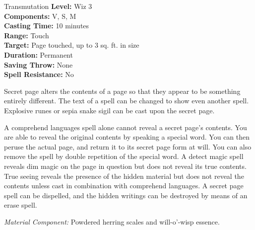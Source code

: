 {Transmutation}
{
	\textbf{Level:}
	Wiz 3\\
	\textbf{Components:}
	V, S, M\\
	\textbf{Casting Time:}
	10 minutes\\
	\textbf{Range:}
	Touch\\
	\textbf{Target:}
	Page touched, up to 3 sq. ft. in size\\
	\textbf{Duration:}
	Permanent\\
	\textbf{Saving Throw:}
	None\\
	\textbf{Spell Resistance:}
	No\\
}
{
	Secret page alters the contents of a page so that they appear to be something entirely different. The text of a spell can be changed to show even another spell. Explosive runes or sepia snake sigil can be cast upon the secret page.

	A comprehend languages spell alone cannot reveal a secret page's contents. You are able to reveal the original contents by speaking a special word. You can then peruse the actual page, and return it to its secret page form at will. You can also remove the spell by double repetition of the special word. A detect magic spell reveals dim magic on the page in question but does not reveal its true contents. True seeing reveals the presence of the hidden material but does not reveal the contents unless cast in combination with comprehend languages. A secret page spell can be dispelled, and the hidden writings can be destroyed by means of an erase spell.

	\textit{Material Component:}
	Powdered herring scales and will-o'-wisp essence.

}
